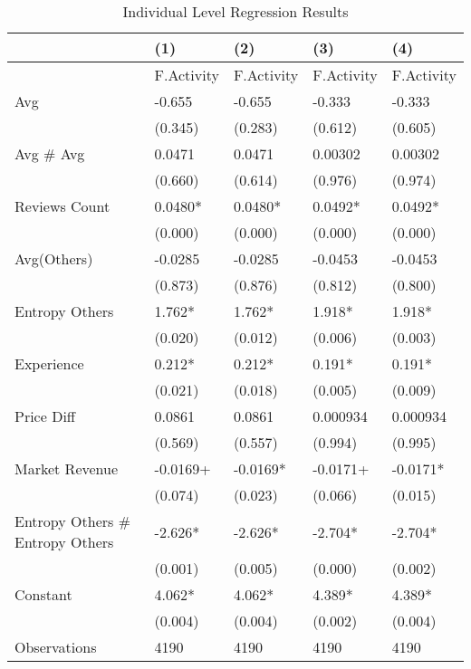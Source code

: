\begin{table}
\centering
\begin{tabular}{@{}lllll@{}}
\toprule
 & (1) & (2) & (3) & (4) \\ \midrule
 & F.Activity & F.Activity & F.Activity & F.Activity \\
Avg & -0.655 & -0.655 & -0.333 & -0.333 \\
 & (0.345) & (0.283) & (0.612) & (0.605) \\
Avg \# Avg & 0.0471 & 0.0471 & 0.00302 & 0.00302 \\
 & (0.660) & (0.614) & (0.976) & (0.974) \\
Reviews Count & 0.0480* & 0.0480* & 0.0492* & 0.0492* \\
 & (0.000) & (0.000) & (0.000) & (0.000) \\
Avg(Others) & -0.0285 & -0.0285 & -0.0453 & -0.0453 \\
 & (0.873) & (0.876) & (0.812) & (0.800) \\
Entropy Others  & 1.762* & 1.762* & 1.918* & 1.918* \\
 & (0.020) & (0.012) & (0.006) & (0.003) \\
Experience & 0.212* & 0.212* & 0.191* & 0.191* \\
 & (0.021) & (0.018) & (0.005) & (0.009) \\
Price Diff & 0.0861 & 0.0861 & 0.000934 & 0.000934 \\
 & (0.569) & (0.557) & (0.994) & (0.995) \\
Market Revenue & -0.0169+ & -0.0169* & -0.0171+ & -0.0171* \\
 & (0.074) & (0.023) & (0.066) & (0.015) \\
Entropy Others  \# Entropy Others  & -2.626* & -2.626* & -2.704* & -2.704* \\
 & (0.001) & (0.005) & (0.000) & (0.002) \\
Constant & 4.062* & 4.062* & 4.389* & 4.389* \\
 & (0.004) & (0.004) & (0.002) & (0.004) \\
Observations & 4190 & 4190 & 4190 & 4190 \\ 
\bottomrule
\end{tabular}
\caption{Individual Level Regression Results}
\label{table_regression_ind}
\end{table}